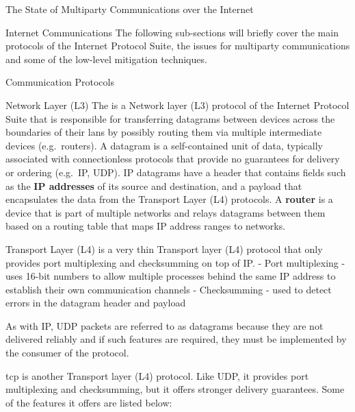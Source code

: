 \begin{frame}[fragile]{The State of Multiparty Communications over the Internet}
\begin{block}{Internet Communications}
The following sub-sections will briefly cover the main protocols of the Internet Protocol Suite, the issues for multiparty communications and some of the low-level mitigation techniques.


\begin{block}{Communication Protocols}
\label{thesis__020-internet.md__communication-protocols}
\begin{block}{Network Layer (L3)}
\label{thesis__020-internet.md__network-layer-l3}
The  \autocite{ipv4RFC} is a Network layer (L3) protocol of the Internet Protocol Suite that is responsible for transferring datagrams between devices across the boundaries of their \glspl{lan} by possibly routing them via multiple intermediate devices (e.g.~routers). A datagram is a self-contained unit of data, typically associated with connectionless protocols that provide no guarantees for delivery or ordering (e.g.~IP, UDP).  IP datagrams have a header that contains fields such as the \textbf{IP addresses} of its source and destination, and a  payload that encapsulates the data from the Transport Layer (L4) protocols. A \textbf{router} is a device that is part of multiple networks and relays datagrams between them based on a routing table that maps IP address ranges to networks.
\end{block}

\begin{block}{Transport Layer (L4)}
\label{thesis__020-internet.md__transport-layer-l4}
 is a very thin Transport layer (L4) protocol that only provides port multiplexing and checksumming on top of IP.
- Port multiplexing - uses 16-bit numbers to allow multiple processes behind the same IP address to establish their own communication channels
- Checksumming - used to detect errors in the datagram header and payload

As with IP, UDP packets are referred to as datagrams because they are not delivered reliably and if such features are required, they must be implemented by the consumer of the protocol.

\gls{tcp} is another Transport layer (L4) protocol. Like UDP, it provides port multiplexing and checksumming, but it offers stronger delivery guarantees. Some of the features it offers are listed below:


\end{block}
\end{block}
\end{block}
\end{frame}
